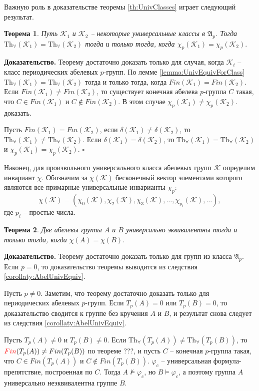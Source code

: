 \documentclass[a4paper,11pt,twoside]{article}
\newtheorem{theorem}{Теорема}[section]
\def\A{{\mathfrak{A}}}
\def\K{{\mathcal{K}}}
\def\Tha{{\mathrm{Th}_\forall}}
\begin{document}
Важную роль в доказательстве теоремы \ref{th:UnivClasses} играет следующий результат.

\begin{theorem}
Путь $\K_1$ и $\K_2$ -- некоторые универсальные классы в $\A_p$. Тогда $\Tha(\K_1) = \Tha(\K_2)$ тогда и только тогда, когда $\chi_p(\K_1) = \chi_p(\K_2).$
\end{theorem}

{\bf Доказательство.} Теорему достаточно доказать только для случая, когда $\K_i$ -- класс периодических абелевых $p$-групп. По лемме \ref{lemma:UnivEquivForClass} $\Tha(\K_1) = \Tha(\K_2)$ тогда и только тогда, когда $Fin(\K_1) = Fin(\K_2)$. Если $Fin(\K_1) \neq Fin(\K_2)$, то существует конечная абелева $p$-группа $C$ такая, что $C \in Fin(\K_1)$ и $C \notin Fin(\K_2)$. В этом случае $\chi_p(\K_1) \neq \chi_p(\K_2)$. {\color{red} доказать}.

Пусть $Fin(\K_1) = Fin(\K_2)$, если $\delta(\K_1) \neq \delta(\K_2)$, то $\Tha(\K_1) \neq \Tha(\K_2)$. Если $\delta(\K_1) = \delta(\K_2)$, то $\Tha(\K_1) = \Tha(\K_2)$ и $\chi_p(\K_1) = \chi_p(\K_2)$. $\square$


Наконец, для произвольного универсального класса абелевых групп $\K$ определим инвариант $\chi$. Обозначим за $\chi(\K)$ бесконечный вектор элементами которого являются все примарные универсальные инварианты $\chi_p$:
$$\chi(\K) = (\chi_0(\K), \chi_2(\K), \chi_3(\K), \ldots, \chi_{p_i}(\K), \ldots ),$$
где $p_i$ -- простые числа.

\begin{theorem}
Две абелевы группы $A$ и $B$ универсально эквивалентны тогда и только тогда, когда $\chi(A) = \chi(B)$.
\end{theorem}

{\bf Доказательство.} Теорему достаточно доказать только для групп из класса $\A_p$. Если $p = 0$, то доказательство теоремы выводится из следствия \ref{corollaty:AbelUnivEquiv}.

Пусть $p \neq 0$. Заметим, что теорему достаточно доказать только для периодических абелевых $p$-групп. Если $T_p(A) = 0$ или $T_p(B) = 0$, то доказательство сводится к группе без кручения $A$ и $B$, и результат снова следует из следствия \ref{corollaty:AbelUnivEquiv}.

Пусть $T_p(A) \neq 0$ и $T_p(B) \neq 0$. Если $\Tha(T_p(A)) \neq \Tha(T_p(B))$, то $\textcolor{red}{Fin}(T_p(A)) \neq Fin(T_p(B))$ по теореме {\color{red}???}, и пусть $C$ -- конечная $p$-группа такая, что $C \in Fin(T_p(A))$ и $C \notin Fin(T_p(B))$. $\varphi_c$ -- универсальная формула-препятствие, построенная по $C$. Тогда $A \nvDash \varphi_c$, но $B \vDash \varphi_c$, а поэтому группа $A$ универсально неэквивалентна группе $B$.
\end{document}
